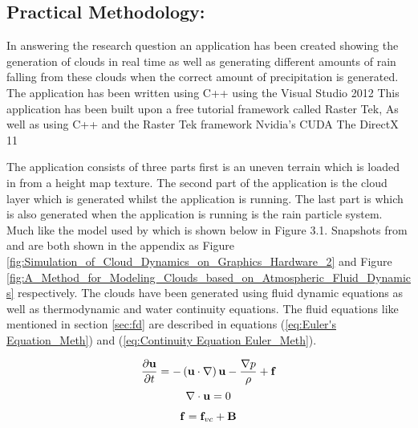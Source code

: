 \subsection{Practical Methodology:}
In answering the research question an application has been created showing the generation of clouds in real time as well as generating different amounts of rain falling from these clouds when the correct amount of precipitation is generated.
The application has been written using C++ using the Visual Studio 2012%
This application has been built upon a free tutorial framework called Raster Tek, %
As well as using C++ and the Raster Tek framework Nvidia’s CUDA %
The DirectX 11 %

The application consists of three parts first is an uneven terrain which is loaded in from a height map texture. The second part of the application is the cloud layer which is generated whilst the application is running. The last part is which is also generated when the application is running is the rain particle system. 
Much like the model used by \citet{DobashiEtAl00} which is shown below in Figure 3.1. Snapshots from \citet{HarrisEtAl03} and \citet{Miyazaki01} are both shown in the appendix as Figure \ref{fig:Simulation_of_Cloud_Dynamics_on_Graphics_Hardware_2} and Figure \ref{fig:A_Method_for_Modeling_Clouds_based_on_Atmospheric_Fluid_Dynamics} respectively.
The clouds have been generated using fluid dynamic equations as well as thermodynamic and water continuity equations. The fluid equations like mentioned in section \ref{sec:fd} are described in equations (\ref{eq:Euler's Equation_Meth}) and (\ref{eq:Continuity Equation Euler_Meth}). 

\begin{equation} \label{eq:Euler's Equation_Meth}
  \centering
   \frac{\partial \mathbf{u}}{\partial t}=-\left(\mathbf{u}\cdot \nabla \right)\mathbf{u}-\frac{\nabla p}{\rho}+\mathbf{f}
\end{equation}
\begin{equation} \label{eq:Continuity Equation Euler_Meth}
  \centering
  \nabla\cdot\mathbf{u}=0
\end{equation}

\begin{equation} \label{eq:forces}
  \centering
  \mathbf{f} = \mathbf{f}_{vc} + \mathbf{B}
\end{equation}

